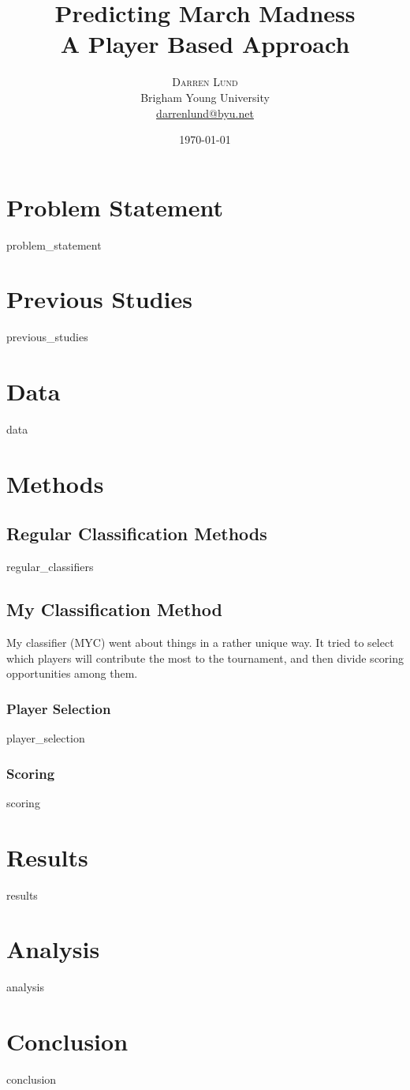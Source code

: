 \documentclass[twoside,twocolumn,11pt]{article}
\title{Predicting March Madness \\ \large A Player Based Approach} %
\author{%
\textsc{Darren Lund}\\[1ex] %
\normalsize Brigham Young University  \\ %
\normalsize \href{mailto:darrenlund59@byu.net}{darrenlund@byu.net} %
}
\date{\today} %
\begin{document}
\maketitle


\section*{Problem Statement}
{problem_statement}
\section*{Previous Studies}
{previous_studies}
\section*{Data}
{data}
\section*{Methods}
\subsection*{Regular Classification Methods}
{regular_classifiers}
\subsection*{My Classification Method}
My classifier (MYC) went about things in a rather unique way.  
It tried to select which players will contribute the most to the tournament, and then divide scoring opportunities among them.  
\subsubsection*{Player Selection}
{player_selection}
\subsubsection*{Scoring}
{scoring}
\section*{Results}
{results}
\section*{Analysis}
{analysis}
\section*{Conclusion}
{conclusion}
\end{document}
